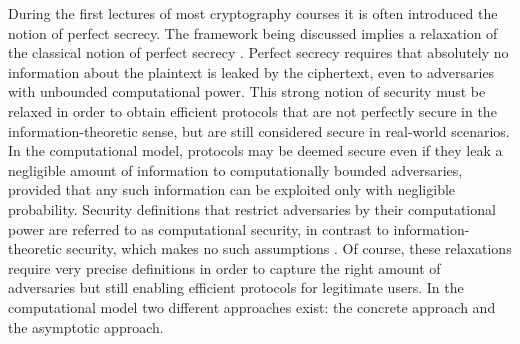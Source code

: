 During the first lectures of most cryptography courses it is often introduced the notion of perfect secrecy. The framework being discussed implies a relaxation of the classical notion of perfect secrecy \cite{shannon-communication-theory-of-secrecy-systems}. Perfect secrecy requires that absolutely no information about the plaintext is leaked by the ciphertext, even to adversaries with unbounded computational power. This strong notion of security must be relaxed in order to obtain efficient protocols that are not perfectly secure in the information-theoretic sense, but are still considered secure in real-world scenarios. In the computational model, protocols may be deemed secure even if they leak a negligible amount of information to computationally bounded adversaries, provided that any such information can be exploited only with negligible probability. Security definitions that restrict adversaries by their computational power are referred to as computational security, in contrast to information-theoretic security, which makes no such assumptions \cite{introduction-to-modern-cryptography}. Of course, these relaxations require very precise definitions in order to capture the right amount of adversaries but still enabling efficient protocols for legitimate users. In the computational model two different approaches exist: the concrete approach and the asymptotic approach.

